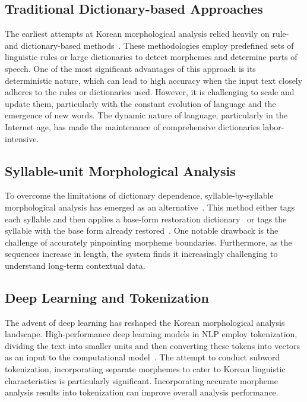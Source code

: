 \documentclass[AMS,STIX2COL]{WileyNJD-v2}
\begin{document}
    \subsection{Traditional Dictionary-based Approaches}\label{subsec:traditional-dictionary-based-approaches}
    The earliest attempts at Korean morphological analysis relied heavily on rule- and dictionary-based methods~\cite{KwonHC1991}.
    These methodologies employ predefined sets of linguistic rules or large dictionaries to detect morphemes and determine parts of speech.
    One of the most significant advantages of this approach is its deterministic nature, which can lead to high accuracy when the input text closely adheres to the rules or dictionaries used.
    However, it is challenging to scale and update them, particularly with the constant evolution of language and the emergence of new words.
    The dynamic nature of language, particularly in the Internet age, has made the maintenance of comprehensive dictionaries labor-intensive.

    \subsection{Syllable-unit Morphological Analysis}\label{subsec:syllable-unit-morphological-analysis}
    To overcome the limitations of dictionary dependence, syllable-by-syllable morphological analysis has emerged as an alternative~\cite{ShimKS2011, LeeCK2013, LeeCH2016, KimHM2016, KimSW2018, ChoiYS2018, KimHM2019, MinJW2019, SongHJ2019, SongHJ2020, YounJY2021, ShinHJ2023}.
    This method either tags each syllable and then applies a base-form restoration dictionary~\cite{ShimKS2011, LeeCH2016} or tags the syllable with the base form already restored~\cite{YounJY2021}.
    One notable drawback is the challenge of accurately pinpointing morpheme boundaries.
    Furthermore, as the sequences increase in length, the system finds it increasingly challenging to understand long-term contextual data.

    \subsection{Deep Learning and Tokenization}\label{subsec:deep-learning-and-tokenization}
    The advent of deep learning has reshaped the Korean morphological analysis landscape.
    High-performance deep learning models in NLP employ tokenization, dividing the text into smaller units and then converting these tokens into vectors as an input to the computational model~\cite{Mikolov2013}.
    The attempt to conduct subword tokenization, incorporating separate morphemes to cater to Korean linguistic characteristics is particularly significant.
    Incorporating accurate morpheme analysis results into tokenization can improve overall analysis performance.
\end{document}

